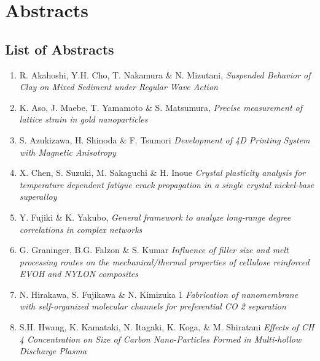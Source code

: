\section{Abstracts}
\subsection*{List of Abstracts}
\begin{enumerate}[label=A\arabic*]

\item R. Akahoshi,  Y.H. Cho, T. Nakamura  \& N. Mizutani, {\em Suspended Behavior of Clay on Mixed Sediment
under Regular Wave Action}

\item K. Aso, J. Maebe, T. Yamamoto \& S. Matsumura, {\em Precise measurement of lattice strain in gold
nanoparticles}

\item S. Azukizawa, H. Shinoda \&  F. Tsumori {\em Development of 4D Printing System
with Magnetic Anisotropy}

\item X. Chen, S. Suzuki,  M. Sakaguchi \& H. Inoue {\em Crystal plasticity analysis for temperature
dependent fatigue crack propagation in a single
crystal nickel-base superalloy}

\item Y. Fujiki \& K. Yakubo, {\em General framework to analyze long-range
degree correlations in complex networks}

\item G. Graninger, B.G. Falzon \& S. Kumar {\em Influence of filler size and melt processing routes
on the mechanical/thermal properties of cellulose
reinforced EVOH and NYLON composites}

\item N. Hirakawa, S. Fujikawa \& N. Kimizuka 1 {\em Fabrication of nanomembrane
with self-organized molecular channels
for preferential CO 2 separation}

\item S.H. Hwang, K. Kamataki, N. Itagaki, K. Koga, \& M. Shiratani {\em Effects of CH 4 Concentration on Size of
Carbon Nano-Particles Formed in Multi-hollow
Discharge Plasma}


\end{enumerate}
